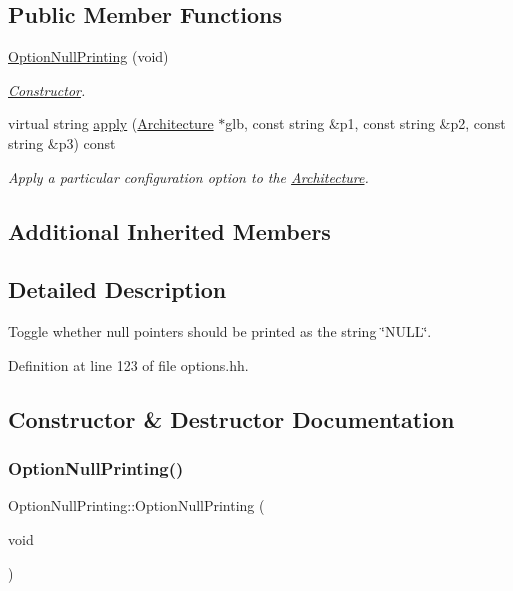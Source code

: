 \subsection*{Public Member Functions}
\begin{DoxyCompactItemize}
\item 
\mbox{\hyperlink{class_option_null_printing_aa174e99903bfb2802ba02896677de810}{Option\+Null\+Printing}} (void)
\begin{DoxyCompactList}\small\item\em \mbox{\hyperlink{class_constructor}{Constructor}}. \end{DoxyCompactList}\item 
virtual string \mbox{\hyperlink{class_option_null_printing_ac2cdd4d12779b79894c3449d8d601110}{apply}} (\mbox{\hyperlink{class_architecture}{Architecture}} $\ast$glb, const string \&p1, const string \&p2, const string \&p3) const
\begin{DoxyCompactList}\small\item\em Apply a particular configuration option to the \mbox{\hyperlink{class_architecture}{Architecture}}. \end{DoxyCompactList}\end{DoxyCompactItemize}
\subsection*{Additional Inherited Members}


\subsection{Detailed Description}
Toggle whether null pointers should be printed as the string \char`\"{}\+N\+U\+L\+L\char`\"{}. 

Definition at line 123 of file options.\+hh.



\subsection{Constructor \& Destructor Documentation}
\mbox{\label{class_option_null_printing_aa174e99903bfb2802ba02896677de810}} 
\subsubsection{\texorpdfstring{OptionNullPrinting()}{OptionNullPrinting()}}
{\footnotesize\ttfamily Option\+Null\+Printing\+::\+Option\+Null\+Printing (\begin{DoxyParamCaption}\item[{void}]{ }\end{DoxyParamCaption})\hspace{0.3cm}{\ttfamily [inline]}}



